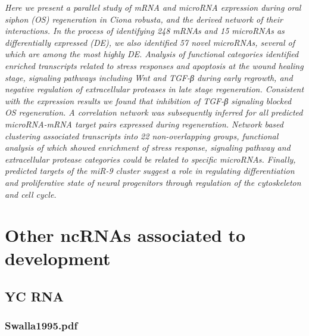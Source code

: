 \documentclass[graybox]{svmult}
\begin{document}
\cite{Spina2017}
\textit{Here we present a parallel study of mRNA and microRNA expression during oral siphon (OS) regeneration in Ciona robusta, and the derived network of their interactions. In the process of identifying 248 mRNAs and 15 microRNAs as differentially expressed (DE), we also identified 57 novel microRNAs, several of which are among the most highly DE. Analysis of functional categories identified enriched transcripts related to stress responses and apoptosis at the wound healing stage, signaling pathways including Wnt and TGF-β during early regrowth, and negative regulation of extracellular proteases in late stage regeneration. Consistent with the expression results we found that inhibition of TGF-β signaling blocked OS regeneration. A correlation network was subsequently inferred for all predicted microRNA-mRNA target pairs expressed during regeneration. Network based clustering associated transcripts into 22 non-overlapping groups, functional analysis of which showed enrichment of stress response, signaling pathway and extracellular protease categories could be related to specific microRNAs. Finally, predicted targets of the miR-9 cluster suggest a role in regulating differentiation and proliferative state of neural progenitors through regulation of the cytoskeleton and cell cycle.}

\section{Other ncRNAs associated to development}
\label{sec:4}

\subsection{YC RNA}
\subsubsection{Swalla1995.pdf}
\end{document}
